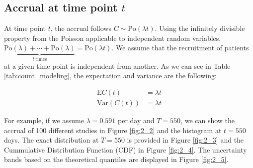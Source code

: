\subsection{Accrual at time point $t$}
At time point $t$, the accrual follows $C\sim \textrm{Po} (\lambda t)$. Using the infinitely divisible property from the Poisson applicable to independent random variables, $\underbrace{\textrm{Po} (\lambda) +\cdots +\textrm{Po} (\lambda)}_{t \ \text{times}} = \textrm{Po} (\lambda t)$. We assume that the recruitment of patients at a given time point is independent from another. As we can see in Table \ref{tab:count_modeling}, the expectation and variance are the following:

\begin{align*}
\textrm{E}C(t) & = \lambda t \\
\textrm{Var}(C(t)) & = \lambda t
\end{align*}

For example, if we assume $\lambda = 0.591$ per day and $T=550$, we can show the accrual of 100 different studies in Figure \ref{fig:2_2} and the histogram at $t=550$ days. The exact distribution at $T=550$ is provided in Figure \ref{fig:2_3} and the Cummulative Distribution Function (CDF) in Figure \ref{fig:2_4}. The uncertainty bands based on the theoretical quantiles are displayed in Figure \ref{fig:2_5}.

